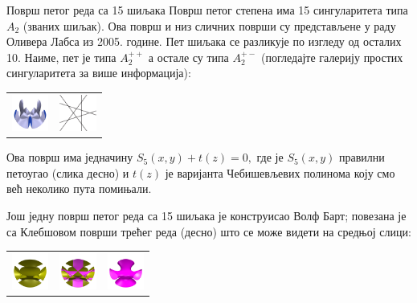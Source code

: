 \begin{surferPage}{Површ петог реда са 15 шиљака}
  Површ петог степена има 15 сингуларитета типа $A_2$
    (званих шиљак). Ова површ и низ сличних површи су представљене у  раду Оливера 
	Лабса из 2005. године.
    Пет шиљака се разликује по изгледу од осталих 10.
    Наиме, пет је типа $A_2^{++}$ а остале су типа $A_2^{+-}$ (погледајте галерију 
	простих сингуларитета за више информација):

     \vspace*{-0.3em}
    \begin{center}
      \begin{tabular}{c@{\qquad}c}
        \includegraphics[height=1.2cm]{./../../common/images/dessins_quint_15a2}
        &
        \includegraphics[height=1.2cm]{./../../common/images/rp5.pdf}
      \end{tabular}
    \end{center}
    \vspace*{-0.3em}    
    
    Ова површ има једначину  
    $S_5(x,y) + t(z)=0,$
    где је $S_5(x,y)$ правилни петоугао (слика десно) и $t(z)$ је варијанта 
	Чебишевљевих полинома коју смо већ неколико пута помињали.

     Још једну површ петог реда са 15 шиљака је конструисао Волф Барт; 
	 повезана је са Клебшовом површи трећег реда (десно) што се може видети на средњој слици:

    \vspace*{-0.3em}
    \begin{center}
      \begin{tabular}{c@{\quad}c@{\quad}c}
        \includegraphics[height=1.2cm]{./../../common/images/barthquintic_green}
        &
        \includegraphics[height=1.2cm]{./../../common/images/barthquintic_clebschcubic}
        &
        \includegraphics[height=1.2cm]{./../../common/images/clebschcubic_pink}
      \end{tabular}
    \end{center}
    \vspace*{-0.3em}
\end{surferPage}
